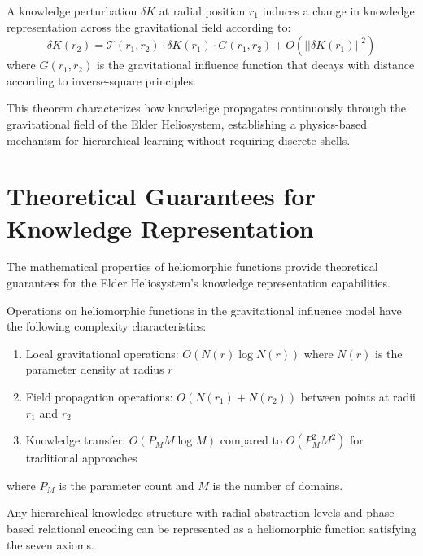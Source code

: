 \begin{theorem}
\begin{theorem}
A knowledge perturbation $\delta K$ at radial position $r_1$ induces a change in knowledge representation across the gravitational field according to:
\begin{equation}
\delta K(r_2) = \mathcal{T}(r_1, r_2) \cdot \delta K(r_1) \cdot G(r_1, r_2) + O(||\delta K(r_1)||^2)
\end{equation}
where $G(r_1, r_2)$ is the gravitational influence function that decays with distance according to inverse-square principles.
\end{theorem}

This theorem characterizes how knowledge propagates continuously through the gravitational field of the Elder Heliosystem, establishing a physics-based mechanism for hierarchical learning without requiring discrete shells.

\section{Theoretical Guarantees for Knowledge Representation}

The mathematical properties of heliomorphic functions provide theoretical guarantees for the Elder Heliosystem's knowledge representation capabilities.

\begin{theorem}
Operations on heliomorphic functions in the gravitational influence model have the following complexity characteristics:
\begin{enumerate}
    \item Local gravitational operations: $O(N(r) \log N(r))$ where $N(r)$ is the parameter density at radius $r$
    \item Field propagation operations: $O(N(r_1) + N(r_2))$ between points at radii $r_1$ and $r_2$
    \item Knowledge transfer: $O(P_M M \log M)$ compared to $O(P_M^2 M^2)$ for traditional approaches
\end{enumerate}
where $P_M$ is the parameter count and $M$ is the number of domains.
\end{theorem}

\begin{theorem}
Any hierarchical knowledge structure with radial abstraction levels and phase-based relational encoding can be represented as a heliomorphic function satisfying the seven axioms.
\end{theorem}


\end{theorem}
